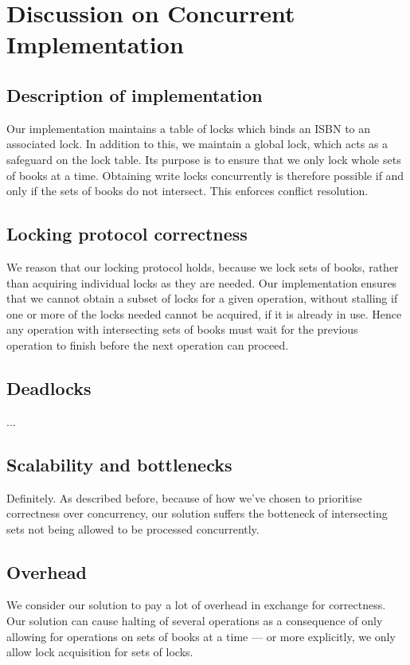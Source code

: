 
\newpage
\section{Discussion on Concurrent Implementation}

\subsection{Description of implementation}
Our implementation maintains a table of locks which binds an ISBN to an
associated lock. In addition to this, we maintain a global lock, which acts as
a safeguard on the lock table. Its purpose is to ensure that we only lock whole
sets of books at a time. Obtaining write locks concurrently is therefore possible
if and only if the sets of books do not intersect. This enforces conflict
resolution.

\subsection{Locking protocol correctness}
We reason that our locking protocol holds, because we lock sets of books, rather
than acquiring individual locks as they are needed. Our implementation ensures
that we cannot obtain a subset of locks for a given operation, without stalling
if one or more of the locks needed cannot be acquired, if it is already in use.
Hence any operation with intersecting sets of books must wait for the previous
operation to finish before the next operation can proceed.

\subsection{Deadlocks}
...

\subsection{Scalability and bottlenecks}
Definitely. As described before, because of how we've chosen to prioritise
correctness over concurrency, our solution suffers the botteneck of intersecting
sets not being allowed to be processed concurrently.

\subsection{Overhead}
We consider our solution to pay a lot of overhead in exchange for correctness.
Our solution can cause halting of several operations as a consequence of only
allowing for operations on sets of books at a time --- or more explicitly, we
only allow lock acquisition for sets of locks.
